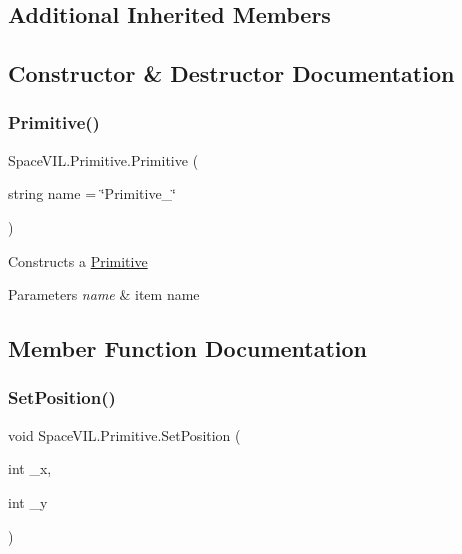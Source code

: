 \subsection*{Additional Inherited Members}


\subsection{Constructor \& Destructor Documentation}
\mbox{\label{class_space_v_i_l_1_1_primitive_a85367e24ebd62b92a6320e87552b81f9}} 
\subsubsection{\texorpdfstring{Primitive()}{Primitive()}}
{\footnotesize\ttfamily Space\+V\+I\+L.\+Primitive.\+Primitive (\begin{DoxyParamCaption}\item[{string}]{name = {\ttfamily \char`\"{}Primitive\+\_\+\char`\"{}} }\end{DoxyParamCaption})}



Constructs a \mbox{\hyperlink{class_space_v_i_l_1_1_primitive}{Primitive}} 


\begin{DoxyParams}{Parameters}
{\em name} & item name \\
\hline
\end{DoxyParams}


\subsection{Member Function Documentation}
\mbox{\label{class_space_v_i_l_1_1_primitive_a65b7f60596ee1c79c447febdd2e8fdde}} 
\subsubsection{\texorpdfstring{Set\+Position()}{SetPosition()}}
{\footnotesize\ttfamily void Space\+V\+I\+L.\+Primitive.\+Set\+Position (\begin{DoxyParamCaption}\item[{int}]{\+\_\+x,  }\item[{int}]{\+\_\+y }\end{DoxyParamCaption})}



